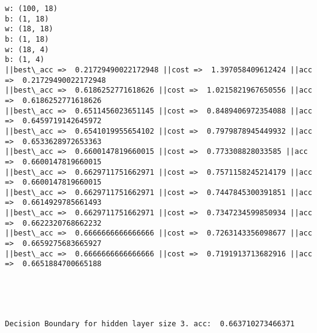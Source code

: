 \documentclass[11pt]{article}
\begin{document}
    \begin{Verbatim}[commandchars=\\\{\}]
w: (100, 18)
b: (1, 18)
w: (18, 18)
b: (1, 18)
w: (18, 4)
b: (1, 4)
||best\_acc =>  0.21729490022172948 ||cost =>  1.397058409612424 ||acc =>  0.21729490022172948
||best\_acc =>  0.6186252771618626 ||cost =>  1.0215821967650556 ||acc =>  0.6186252771618626
||best\_acc =>  0.6511456023651145 ||cost =>  0.8489406972354088 ||acc =>  0.6459719142645972
||best\_acc =>  0.6541019955654102 ||cost =>  0.7979878945449932 ||acc =>  0.6533628972653363
||best\_acc =>  0.6600147819660015 ||cost =>  0.773308828033585 ||acc =>  0.6600147819660015
||best\_acc =>  0.6629711751662971 ||cost =>  0.7571158245214179 ||acc =>  0.6600147819660015
||best\_acc =>  0.6629711751662971 ||cost =>  0.7447845300391851 ||acc =>  0.6614929785661493
||best\_acc =>  0.6629711751662971 ||cost =>  0.7347234599850934 ||acc =>  0.6622320768662232
||best\_acc =>  0.6666666666666666 ||cost =>  0.7263143356098677 ||acc =>  0.6659275683665927
||best\_acc =>  0.6666666666666666 ||cost =>  0.7191913713682916 ||acc =>  0.6651884700665188

    \end{Verbatim}

    \begin{center}
    \end{center}
    { \hspace*{\fill} \\}
    
    \begin{center}
    \end{center}
    { \hspace*{\fill} \\}
    
    \begin{Verbatim}[commandchars=\\\{\}]
Decision Boundary for hidden layer size 3. acc:  0.663710273466371

    \end{Verbatim}
\end{document}
